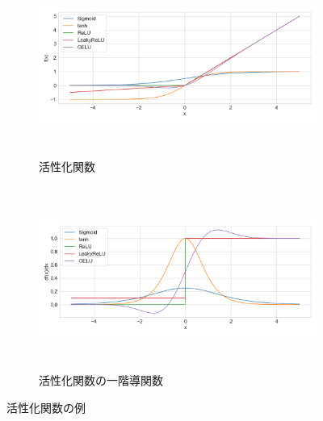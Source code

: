 \documentclass[12pt]{jarticle}
\numberwithin{equation}{section}    %
\numberwithin{figure}{section}      %
\numberwithin{table}{section}      %
\begin{document}


\begin{figure}[tb]
    \centering
    \begin{subfigure}[b]{1.0\textwidth}
        \centering
        \includegraphics[height=6cm]{./figure/sec3/activations.png}
        \caption{活性化関数}
        \label{sec3:fig:activations}
    \end{subfigure}
    \begin{subfigure}[b]{1.0\textwidth}
        \centering
        \includegraphics[height=6cm]{./figure/sec3/activations_prime.png}
        \caption{活性化関数の一階導関数}
        \label{sec3:fig:activations_prime}
    \end{subfigure}
    \caption{活性化関数の例}
    \label{sec3:fig:activations_and_their_prime}
\end{figure}
\end{document}
